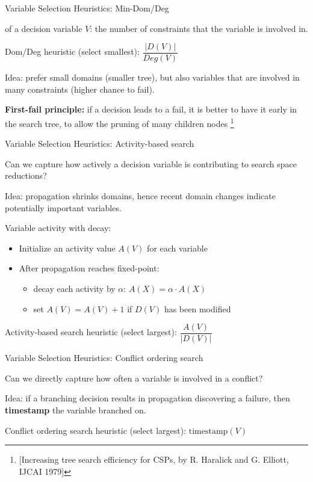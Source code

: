 \documentclass{cons-beamer}
\begin{document}
\begin{frame}{Variable Selection Heuristics: Min-Dom/Deg}
	
	 of a decision variable $V$: the number of constraints that the variable is involved in.
	\vfill
	
	Dom/Deg heuristic (select smallest): $\dfrac{|D(V)|}{Deg(V)}$
	\vfill
	
	Idea: prefer small domains (smaller tree), but also variables that are involved in many constraints (higher chance to fail).
	\vfill
	
	\textbf{First-fail principle:} if a decision leads to a fail, it is better to have it early in the search tree, to allow the pruning of many children nodes \footnote{[Increasing tree search efficiency for CSPs, by R. Haralick and G. Elliott, IJCAI 1979]}
\end{frame}


\begin{frame}{Variable Selection Heuristics: Activity-based search}
	
	Can we capture how actively a decision variable is contributing to search space reductions?
	\vfill
	
	Idea: propagation shrinks domains, hence recent domain changes indicate potentially important variables.
	\vfill
	
	Variable activity with decay:
	\begin{itemize}
		\item Initialize an activity value $A(V)$ for each variable
		\item After propagation reaches fixed-point:
		\begin{itemize}
			\item decay each activity by $\alpha$: $A(X) = \alpha \cdot A(X)$
			\item set $A(V) = A(V)+1$ if $D(V)$ has been modified
		\end{itemize}
	\end{itemize}
	\vfill
	Activity-based search heuristic (select largest): $\dfrac{A(V)}{|D(V)|}$
\end{frame}

\begin{frame}{Variable Selection Heuristics: Conflict ordering search}
	
	Can we directly capture how often a variable is involved in a conflict?
	\vfill
	
	Idea: if a branching decision results in propagation discovering a failure, then \textbf{timestamp} the variable branched on.
	\vfill
	
	Conflict ordering search heuristic (select largest): $\text{timestamp}(V)$
\end{frame}
\end{document}
